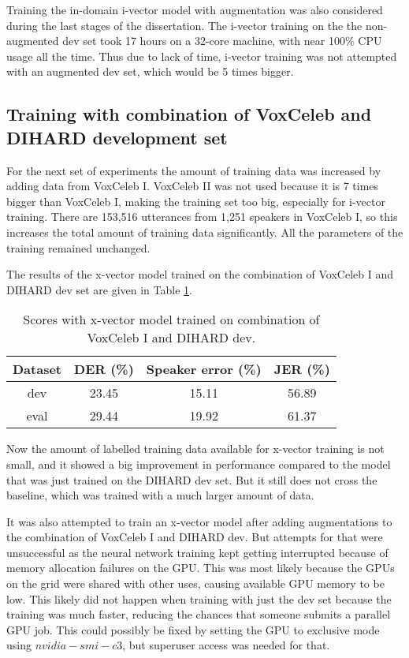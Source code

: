 		Training the in-domain i-vector model with augmentation was also considered during the last stages of the dissertation. The i-vector training on the the non-augmented dev set took 17 hours on a 32-core machine, with near 100\% CPU usage all the time. Thus due to lack of time, i-vector training was not attempted with an augmented dev set, which would be 5 times bigger.
		
		\subsection{Training with combination of VoxCeleb and DIHARD development set}
			For the next set of experiments the amount of training data was increased by adding data from VoxCeleb I. VoxCeleb II was not used because it is 7 times bigger than VoxCeleb I, making the training set too big, especially for i-vector training. There are 153,516 utterances from 1,251 speakers in VoxCeleb I, so this increases the total amount of training data significantly. All the parameters of the training remained unchanged.
			
			The results of the x-vector model trained on the combination of VoxCeleb I and DIHARD dev set are given in Table \ref{table-voxdev-xvec}.
			
			\begin{table}[h]
				\centering
				\begin{tabular}{|c|c|c|c|}
					\hline
					Dataset & DER (\%) & Speaker error (\%) & JER (\%) \\
					\hline
					dev & 23.45 & 15.11 & 56.89 \\
					\hline
					eval & 29.44 & 19.92 & 61.37 \\
					\hline
				\end{tabular}
				\caption{Scores with x-vector model trained on combination of VoxCeleb I and DIHARD dev.}
				\label{table-voxdev-xvec}
			\end{table}
		
		Now the amount of labelled training data available for x-vector training is not small, and it showed a big improvement in performance compared to the model that was just trained on the DIHARD dev set. But it still does not cross the baseline, which was trained with a much larger amount of data.
		
		It was also attempted to train an x-vector model after adding augmentations to the combination of VoxCeleb I and DIHARD dev. But attempts for that were unsuccessful as the neural network training kept getting interrupted because of memory allocation failures on the GPU. This was most likely because the GPUs on the grid were shared with other uses, causing available GPU memory to be low. This likely did not happen when training with just the dev set because the training was much faster, reducing the chances that someone submits a parallel GPU job. This could possibly be fixed by setting the GPU to exclusive mode using $nvidia-smi -c 3$, but superuser access was needed for that.
				
